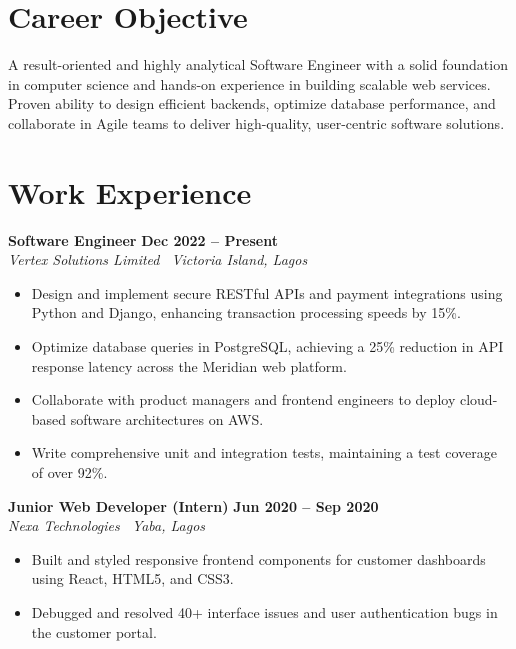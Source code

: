 \documentclass[10pt,a4paper]{article}
\begin{document}
\hfill
\begin{minipage}[t]{0.65\textwidth}
    \raggedright
    \section*{Career Objective}
    A result-oriented and highly analytical Software Engineer with a solid foundation in computer science and hands-on experience in building scalable web services. Proven ability to design efficient backends, optimize database performance, and collaborate in Agile teams to deliver high-quality, user-centric software solutions.

    \section*{Work Experience}
    \textbf{Software Engineer} \hfill \textbf{Dec 2022 -- Present} \\
    \textit{Vertex Solutions Limited \textperiodcentered\ Victoria Island, Lagos}
    \begin{itemize}[leftmargin=*,noitemsep,topsep=2pt]
        \item Design and implement secure RESTful APIs and payment integrations using Python and Django, enhancing transaction processing speeds by 15\%.
        \item Optimize database queries in PostgreSQL, achieving a 25\% reduction in API response latency across the Meridian web platform.
        \item Collaborate with product managers and frontend engineers to deploy cloud-based software architectures on AWS.
        \item Write comprehensive unit and integration tests, maintaining a test coverage of over 92\%.
    \end{itemize}

    \vspace{0.2cm}

    \textbf{Junior Web Developer (Intern)} \hfill \textbf{Jun 2020 -- Sep 2020} \\
    \textit{Nexa Technologies \textperiodcentered\ Yaba, Lagos}
    \begin{itemize}[leftmargin=*,noitemsep,topsep=2pt]
        \item Built and styled responsive frontend components for customer dashboards using React, HTML5, and CSS3.
        \item Debugged and resolved 40+ interface issues and user authentication bugs in the customer portal.
    \end{itemize}


\end{minipage}
\end{document}

